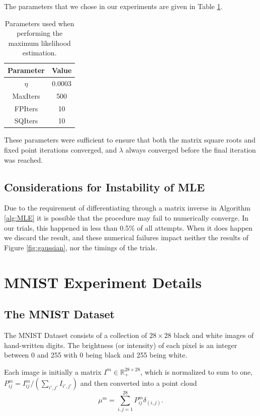 \documentclass[nohyperref]{article}
\theoremstyle{definition}
\begin{document}
The parameters that we chose in our experiments are given in Table \ref{tab:ag_params}.
\begin{table}[]
\centering
\begin{tabular}{|c|c|}
\hline
Parameter & Value  \\ \hline
$\eta$    & 0.0003 \\ \hline
MaxIters  & 500    \\ \hline
FPIters   & 10     \\ \hline
SQIters   & 10     \\ \hline
\end{tabular}
\caption{\label{tab:ag_params}Parameters used when performing the maximum likelihood estimation.}
\end{table}
These parameters were sufficient to ensure that both the matrix square roots and fixed point iterations converged, and $\lambda$ always converged before the final iteration was reached.

\subsection{Considerations for Instability of MLE}

Due to the requirement of differentiating through a matrix inverse in Algorithm \ref{alg:MLE} it is possible that the procedure may fail to numerically converge. In our trials, this happened in less than 0.5\% of all attempts. When it does happen we discard the result, and these numerical failures impact neither the results of Figure \ref{fig:gaussian}, nor the timings of the trials. 

\section{MNIST Experiment Details}\label{SM:MNIST}

\subsection{The MNIST Dataset} The MNIST Dataset \cite{lecun1998mnist} consists of a collection of $28 \times 28$ black and white images of hand-written digits. The brightness (or intensity) of each pixel is an integer between 0 and 255 with 0 being black and 255 being white. 

Each image is initially a matrix $I^m \in \mathbb{R}^{28\times 28}_+$, which is normalized to sum to one, $P^m_{ij} = I^m_{ij} / (\sum_{i',j'}I_{i',j'})$ and then converted into a point cloud 
$$\mu^m = \sum_{i,j=1}^{28} P^m_{ij}\delta_{(i,j)}.$$
\end{document}
